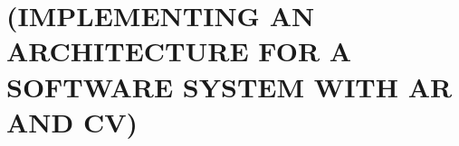 \chapter{(IMPLEMENTING AN ARCHITECTURE FOR A SOFTWARE SYSTEM WITH AR AND CV)} 
\label{implementation}

